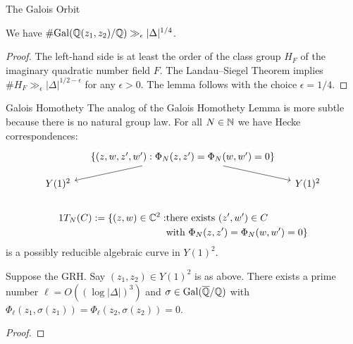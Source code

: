\documentclass{beamer}
\begin{document}
\begin{frame}{The Galois Orbit}
  \begin{lemma}
    We have
      $\# \mathrm{Gal}({\mathbb{Q}}(z_1,z_2)/{\mathbb{Q}}) \gg_\epsilon
      |\Delta|^{1/4}$.
  \end{lemma}
  \begin{proof}
    The left-hand side is at least the order of the class group $H_F$
    of the imaginary quadratic number field $F$. The Landau--Siegel Theorem
    implies $\# H_F \gg_\epsilon |\Delta|^{1/2-\epsilon}$ for any $\epsilon>0$. 
    The lemma follows with the choice $\epsilon =1/4$. 
  \end{proof}

\end{frame}
\begin{frame}{Galois Homothety}
  The analog of the Galois Homothety Lemma is more subtle because
  there is no natural group law.
  For all $N\in{\mathbb{N}}$
  we have \alert{Hecke correspondences}:
  \begin{equation*}
    \begin{tikzcd}[ampersand replacement=\&,column sep=small, row sep=small] 
      \& \{(z,w,z',w') : \Phi_N(z,z')=\Phi_N(w,w')=0\} \arrow{ddl}[swap]{} \arrow{ddr}{} \&\\
      \&  \&\\[-2ex]
      Y(1)^2  \& \& Y(1)^2 \\
    \end{tikzcd}
  \end{equation*}
  
  \begin{definition}
    \begin{alignat*}1
      T_N(C) := \{(z,w) \in\IC^2 : &\text{there exists $(z',w')\in C$}\\
      &\text{with $\Phi_N(z,z')=\Phi_N(w,w')=0$}\}
    \end{alignat*}
    is a possibly reducible algebraic curve in $Y(1)^2$. 
  \end{definition}
\end{frame}

\begin{frame}
  \begin{lemma}
    Suppose the \alert{GRH}.
    Say $(z_1,z_2)\in Y(1)^2$ is as above.
    There exists a prime number $\ell=O((\log
    |\Delta|)^3)$ and $\sigma\in \mathrm{Gal}({\overline{\mathbb{Q}}}/{\mathbb{Q}})$
    with $\Phi_\ell(z_1,\sigma(z_1))=\Phi_\ell(z_2,\sigma(z_2))=0$. 
  \end{lemma}
  \begin{proof}
    \vspace{4cm}
  \end{proof}
\end{frame}
\end{document}
